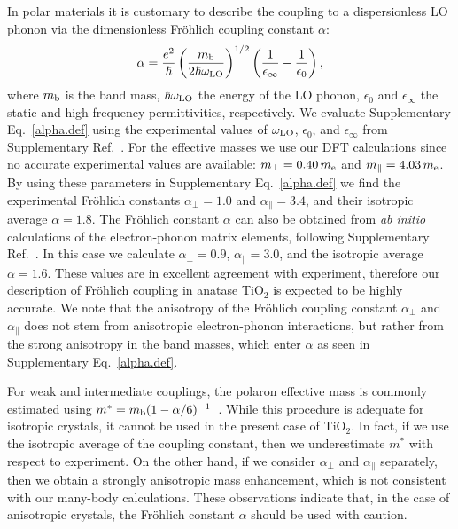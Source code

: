 \documentclass[12pt]{nature-mod}
\begin{document}
In polar materials it is customary to describe the coupling to a dispersionless LO phonon via the 
dimensionless Fr\"ohlich coupling constant $\alpha$:
  \begin{equation} \label{alpha.def}
  \alpha=\frac{e^2}{\hbar}\left(\frac{m_{\rm b}}{2\hbar\omega_{\rm LO}}\right)^{1/2}
  \left(\frac{1}{\epsilon_\infty}-\frac{1}{\epsilon_0}\right),
  \end{equation}
where $m_{\rm b}$ is the band mass, $\hbar\omega_{\rm LO}$ the energy of the LO phonon, $\epsilon_0$ 
and $\epsilon_\infty$ the static and high-frequency permittivities, respectively. We evaluate 
Supplementary Eq.~\eqref{alpha.def} using the experimental values of $\omega_{\rm LO}$, 
$\epsilon_0$, and $\epsilon_\infty$ from Supplementary Ref.~. 
For the effective masses we use our DFT 
calculations since no accurate experimental values are available: $m_\perp=0.40\, m_{\rm e}$ and 
$m_\parallel=4.03\,m_{\rm e}$. By using these parameters in Supplementary Eq.~\eqref{alpha.def} 
we find the experimental Fr\"ohlich constants $\alpha_\perp=1.0$ and $\alpha_\parallel=3.4$, and their 
isotropic average $\alpha=1.8$. The Fr\"ohlich constant $\alpha$ can also be obtained from {\it ab initio} 
calculations of the electron-phonon matrix elements, following Supplementary Ref.~. 
In this case we calculate $\alpha_\perp=0.9$, $\alpha_\parallel=3.0$, and the isotropic average $\alpha=1.6$. 
These values are in excellent agreement with experiment, therefore our description of Fr\"ohlich 
coupling in anatase TiO$_2$ is expected to be highly accurate. We note that the anisotropy of the 
Fr\"ohlich coupling constant $\alpha_\perp$ and $\alpha_\parallel$ does not stem from anisotropic 
electron-phonon interactions, but rather from the strong anisotropy in the band masses, which enter 
$\alpha$ as seen in Supplementary Eq.~\eqref{alpha.def}.

For weak and intermediate couplings, the polaron effective mass is commonly estimated using 
$m^*= m_{\rm b}(1-\alpha/6)^{-1}$~\cite{Frohlich1954, Mishchenko2000}. While this procedure is
adequate for isotropic crystals, it cannot be used in the present case of TiO$_2$. In fact, if 
we use the isotropic average of the coupling constant, then we underestimate $m^*$ with respect 
to experiment\cite{Moser2013}. On the other hand, if we consider $\alpha_\perp$ and $\alpha_\parallel$ 
separately, then we obtain a strongly anisotropic mass enhancement, which is not consistent with our 
many-body calculations. These observations indicate that, in the case of anisotropic crystals, the 
Fr\"ohlich constant $\alpha$ should be used with caution.
\end{document}
